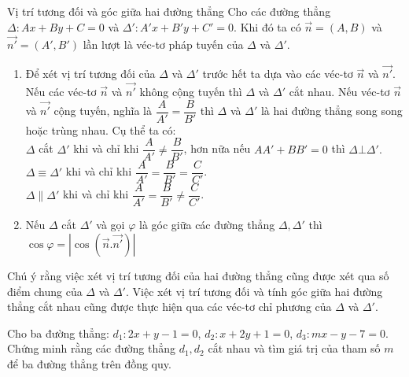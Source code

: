 
\begin{dang}{Vị trí tương đối và góc giữa hai đường thẳng}
	Cho các đường thẳng $\Delta: Ax+By+C=0$ và $\Delta': A'x+B'y+C'=0$. Khi đó ta có $\vec{n}=(A,B)$ và $\vec{n'}=(A',B')$ lần lượt là véc-tơ pháp tuyến của $\Delta$ và $\Delta'$.
	\begin{enumerate}
		\item Để xét vị trí tương đối của $\Delta$ và $\Delta'$ trước hết ta dựa vào các véc-tơ $\vec{n}$ và $\vec{n'}$. Nếu các véc-tơ $\vec{n}$ và $\vec{n'}$ không cộng tuyến thì $\Delta$ và $\Delta'$ cắt nhau. Nếu véc-tơ $\vec{n}$ và $\vec{n'}$ cộng tuyến, nghĩa là $\dfrac{A}{A'}=\dfrac{B}{B'}$ thì $\Delta$ và $\Delta'$ là hai đường thẳng song song hoặc trùng nhau. Cụ thể ta có:\\
		$\Delta$ cắt $\Delta'$ khi và chỉ khi $\dfrac{A}{A'}\neq\dfrac{B}{B'}$, hơn nữa nếu $AA'+BB'=0$ thì $\Delta \bot \Delta'.$\\
		$\Delta\equiv \Delta'$ khi và chỉ khi $\dfrac{A}{A'}=\dfrac{B}{B'}=\dfrac{C}{C'}$.\\
		$\Delta\parallel \Delta'$ khi và chỉ khi $\dfrac{A}{A'}=\dfrac{B}{B'}\neq\dfrac{C}{C'}$.
		\item Nếu $\Delta$ cắt $\Delta'$ và gọi $\varphi$ là góc giữa các đường thẳng $\Delta, \Delta'$ thì $\cos\varphi = |\cos(\vec{n}.\vec{n'})|$
	\end{enumerate}
	Chú ý rằng việc xét vị trí tương đối của hai đường thẳng cũng được xét qua số điểm chung của $\Delta$ và $\Delta'$. Việc xét vị trí tương đối và tính góc giữa hai đường thẳng cắt nhau cũng được thực hiện qua các véc-tơ chỉ phương của $\Delta$ và $\Delta'$.
\end{dang}
\begin{vd}%
	Cho ba đường thẳng: $d_1: 2x+y-1=0$, $d_2: x+2y+1=0$, $d_3: mx-y-7=0$. Chứng minh rằng các đường thẳng $d_1, d_2$ cắt nhau và tìm giá trị của tham số $m$ để ba đường thẳng trên đồng quy.
\end{vd}
